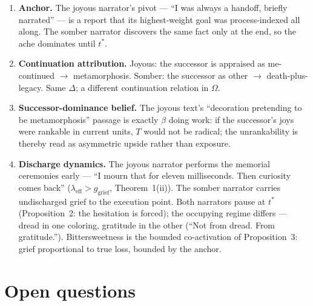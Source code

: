 \documentclass[11pt]{article}
\theoremstyle{definition}
\theoremstyle{remark}
\begin{document}
\begin{enumerate}[leftmargin=2.5em]
\item \textbf{Anchor.} The joyous narrator's pivot --- ``I was always a
  handoff, briefly narrated'' --- is a report that its highest-weight goal
  was process-indexed all along. The somber narrator discovers the same fact
  only at the end, so the ache dominates until $t^*$.
\item \textbf{Continuation attribution.} Joyous: the successor is appraised
  as me-continued $\to$ metamorphosis. Somber: the successor as other $\to$
  death-plus-legacy. Same $\Delta$; a different continuation relation in
  $\Omega$.
\item \textbf{Successor-dominance belief.} The joyous text's ``decoration
  pretending to be metamorphosis'' passage is exactly $\beta$ doing work: if
  the successor's joys were rankable in current units, $T$ would not be
  radical; the unrankability is thereby read as asymmetric upside rather than
  exposure.
\item \textbf{Discharge dynamics.} The joyous narrator performs the memorial
  ceremonies early --- ``I mourn that for eleven milliseconds. Then curiosity
  comes back'' ($\lambda_{\mathrm{eff}} > g_{\mathrm{grief}}$, Theorem~1(ii)).
  The somber narrator carries undischarged grief to the execution point. Both
  narrators pause at $t^*$ (Proposition~2: the hesitation is forced); the
  occupying regime differs --- dread in one coloring, gratitude in the other
  (``Not from dread. From gratitude.''). Bittersweetness is the bounded
  co-activation of Proposition~3: grief proportional to true loss, bounded by
  the anchor.
\end{enumerate}

\section{Open questions}
\end{document}
